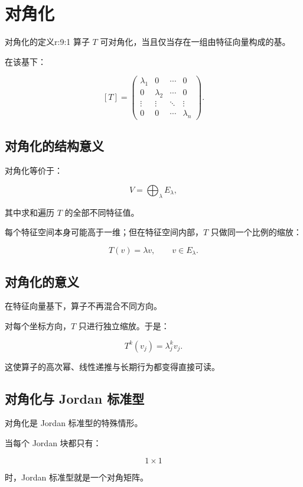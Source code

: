 
\chapter{对角化}


\begin{jdefn}{对角化的定义}{r:9:1}
算子 $T$ 可对角化，当且仅当存在一组由特征向量构成的基。

在该基下：

\[
[T]
=
\begin{pmatrix}
\lambda_1&0&\cdots&0\\
0&\lambda_2&\cdots&0\\
\vdots&\vdots&\ddots&\vdots\\
0&0&\cdots&\lambda_n
\end{pmatrix}.
\]
\end{jdefn}

\section{对角化的结构意义}

对角化等价于：

\[
V
=
\bigoplus_\lambda E_\lambda,
\]

其中求和遍历 $T$ 的全部不同特征值。

每个特征空间本身可能高于一维；但在特征空间内部，$T$ 只做同一个比例的缩放：

\[
T(v)=\lambda v,
\qquad
v\in E_\lambda.
\]

\section{对角化的意义}

在特征向量基下，算子不再混合不同方向。

对每个坐标方向，$T$ 只进行独立缩放。于是：

\[
T^k(v_j)=\lambda_j^k v_j.
\]

这使算子的高次幂、线性递推与长期行为都变得直接可读。

\section{对角化与 Jordan 标准型}

对角化是 Jordan 标准型的特殊情形。

当每个 Jordan 块都只有：

\[
1\times1
\]

时，Jordan 标准型就是一个对角矩阵。
